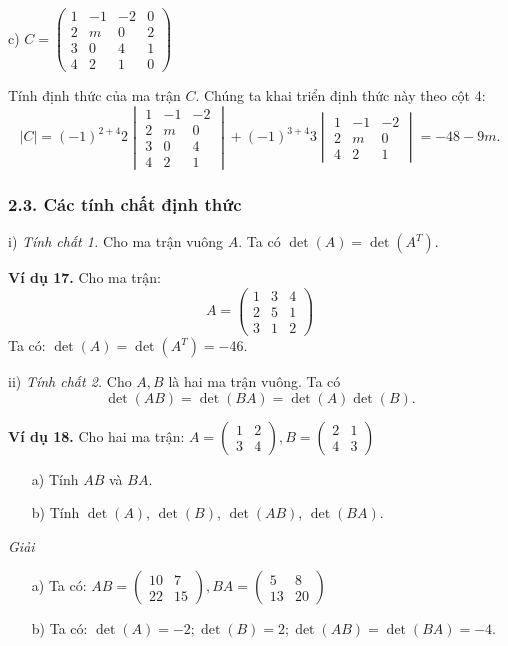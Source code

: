 c) \( C = \begin{pmatrix}
1 & -1 & -2 & 0 \\
2 & m & 0 & 2 \\
3 & 0 & 4 & 1 \\
4 & 2 & 1 & 0
\end{pmatrix} \)

Tính định thức của ma trận \(C\). Chúng ta khai triển định thức này theo cột 4:
\[
|C| = (-1)^{2+4} 2 \begin{vmatrix}
1 & -1 & -2 \\
2 & m & 0 \\
3 & 0 & 4 \\
4 & 2 & 1
\end{vmatrix}
+ (-1)^{3+4} 3 \begin{vmatrix}
1 & -1 & -2 \\
2 & m & 0 \\
4 & 2 & 1
\end{vmatrix}
= -48 - 9m.
\]
\subsubsection*{2.3. Các tính chất định thức}

i) \textit{Tính chất 1.} Cho ma trận vuông \(A\). Ta có \(\det(A) = \det(A^T)\).

\textbf{Ví dụ 17.} Cho ma trận:
\[
A = \begin{pmatrix}
1 & 3 & 4 \\
2 & 5 & 1 \\
3 & 1 & 2
\end{pmatrix}
\]
Ta có: \(\det(A) = \det(A^T) = -46\).

ii) \textit{Tính chất 2.} Cho \(A, B\) là hai ma trận vuông. Ta có
\[
\det(AB) = \det(BA) = \det(A)\det(B).
\]

\textbf{Ví dụ 18.} Cho hai ma trận: \( A = \begin{pmatrix}
1 & 2 \\
3 & 4
\end{pmatrix}, B = \begin{pmatrix}
2 & 1 \\
4 & 3
\end{pmatrix} \)
\begin{itemize}
    \item[a)] Tính \( AB \) và \( BA \).
    \item[b)] Tính \(\det(A)\), \(\det(B)\), \(\det(AB)\), \(\det(BA)\).
\end{itemize}

\textit{Giải}
\begin{itemize}
    \item[a)] Ta có: \( AB = \begin{pmatrix}
    10 & 7 \\
    22 & 15
    \end{pmatrix}, BA = \begin{pmatrix}
    5 & 8 \\
    13 & 20
    \end{pmatrix} \)
    \item[b)] Ta có: \(\det(A) = -2; \det(B) = 2; \det(AB) = \det(BA) = -4\).
\end{itemize}

